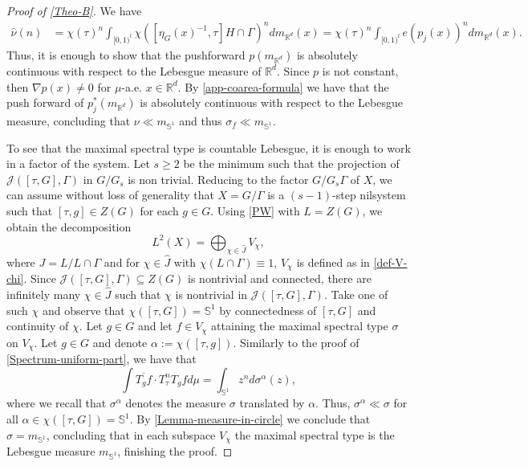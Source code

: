 \documentclass[10pt,a4paper]{amsart}
\newcommand{\R}{\mathbb{R}}
\newcommand{\bS}{\mathbb{S}}
\begin{document}
\begin{proof}[Proof of \cref{Theo-B}]
We have  
\begin{align*}
  \widehat{\nu}(n)&= \chi(\tau)^n\int_{[0,1)^l} \chi([\eta_G(x)^{-1},\tau] H\cap \Gamma)^n dm_{\R^d}(x)=\chi(\tau)^n \int_{[0,1)^l} e(p_j(x))^n dm_{\R^d}(x).   
\end{align*}
Thus, it is enough to show that the pushforward $p(m_{\R^d})$ is absolutely continuous with respect to the Lebesgue measure of $\R^d$. Since $p$ is not constant, then $\nabla p(x)\neq 0$ for $\mu$-a.e. $x\in \R^d$. By \cref{app-coarea-formula} we have that the push forward of $p_j^*(m_{\R^d})$ is absolutely continuous with respect to the Lebesgue measure, concluding that $ \nu \ll m_{\bS^1}$ and thus $\sigma_f\ll m_{\bS^1} $.

To see that the maximal spectral type is countable Lebesgue, it is enough to work in a factor of the system. Let $s\geq 2$ be the minimum such that the projection of $\mathcal{J}([\tau,G],\Gamma)$ in $G/G_{s}$ is non trivial. Reducing to the factor $G/G_s\Gamma$ of $X$, we can assume without loss of generality that $X=G/\Gamma$ is a $(s-1)$-step nilsystem such that $[\tau,g]\in Z(G)$ for each $g\in G$. Using \cref{PW} with $L=Z(G)$, we obtain the decomposition 
$$L^2(X)=\bigoplus_{\chi\in \widehat{J}}V_\chi, $$
    where $J= L/L\cap \Gamma$ and for $\chi\in \widehat{J}$ with $\chi(L\cap \Gamma)\equiv 1$, $V_\chi$ is defined as in \cref{def-V-chi}. 
    Since $\mathcal{J}([\tau,G],\Gamma)\subseteq Z(G)$ is nontrivial and connected, there are infinitely many $\chi\in \hat{J}$ such that $\chi$ is nontrivial in $\mathcal{J}([\tau,G],\Gamma)$. Take one of such $\chi$ and observe that $\chi([\tau,G])=\bS^1$ by connectedness of $[\tau,G]$ and continuity of $\chi$. Let $g\in G$ and let $f\in V_\chi$ attaining the maximal spectral type $\sigma$ on $V_\chi$. Let $g\in G$ and denote $\alpha:=  \chi([\tau,g])$. Similarly to the proof of \cref{Spectrum-uniform-part}, we have that 
    \begin{equation*}
       \int  \overline{T_gf} \cdot T_\tau^nT_gfd\mu= \int_{\bS^1} z^n d\sigma^\alpha(z),
    \end{equation*}
where we recall that $\sigma^\alpha$ denotes the measure $\sigma$ translated by $\alpha$. Thus, $\sigma^\alpha\ll \sigma$ for all $\alpha\in \chi([\tau,G])=\bS^1    $. By \cref{Lemma-measure-in-circle} we conclude that $\sigma=m_{\bS^1}$, concluding that in each subspace $V_\chi$ the maximal spectral type is the Lebesgue measure $m_{\bS^1}$, finishing the proof.  
\end{proof}
\end{document}

